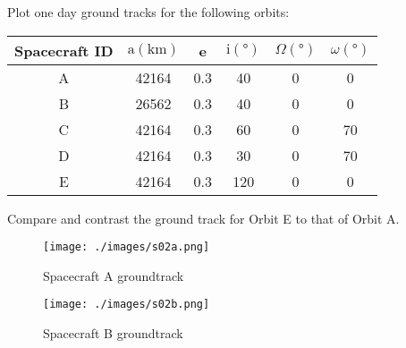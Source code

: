\begin{hwkProblem}{2}{}

	Plot one day ground tracks for the following orbits:
	\begin{center}
		\begin{tabular}{cccccc}
			\hline Spacecraft ID & \( \mathrm{a}(\unit{\km}) \) & e   & \( \mathrm{i}(\unit{\degree}) \) & \( \Omega(\unit{\degree}) \) & \( \omega(\unit{\degree}) \) \\
			\hline
			A                    & 42164                        & 0.3 & 40                               & 0                            & 0                            \\
			B                    & 26562                        & 0.3 & 40                               & 0                            & 0                            \\
			C                    & 42164                        & 0.3 & 60                               & 0                            & 70                           \\
			D                    & 42164                        & 0.3 & 30                               & 0                            & 70                           \\
			E                    & 42164                        & 0.3 & 120                              & 0                            & 0                            \\
			\hline
		\end{tabular}
	\end{center}
	Compare and contrast the ground track for Orbit E to that of Orbit A.

	\hwkSol
	
	

	\hwkPart

	\begin{figure}[H]
		\begin{center}
			\texttt{[image: ./images/s02a.png]}
		\end{center}
		\caption{Spacecraft A groundtrack}\label{fig:s02a}
	\end{figure}

	

	\hwkPart

	\begin{figure}[H]
		\begin{center}
			\texttt{[image: ./images/s02b.png]}
		\end{center}
		\caption{Spacecraft B groundtrack}\label{fig:s02b}
	\end{figure}


\end{hwkProblem}
